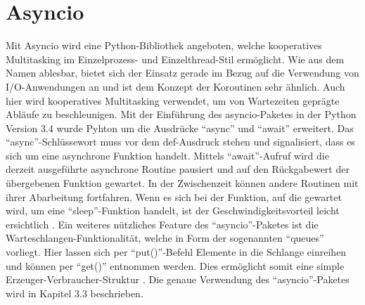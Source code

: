 \section{Asyncio}
Mit Asyncio wird eine Python-Bibliothek angeboten, welche kooperatives Multitasking im Einzelprozess- und Einzelthread-Stil ermöglicht. Wie aus dem Namen ablesbar, bietet sich der Einsatz gerade im Bezug auf die Verwendung von I/O-Anwendungen an und ist dem Konzept der Koroutinen sehr ähnlich. Auch hier wird kooperatives Multitasking verwendet, um von Wartezeiten geprägte Abläufe zu beschleunigen. Mit der Einführung des asyncio-Paketes in der Python Version 3.4 wurde Pyhton um die Ausdrücke ``async'' und ``await'' erweitert. Das ``async''-Schlüssewort muss vor dem def-Ausdruck stehen und signalisiert, dass es sich um eine asynchrone Funktion handelt. Mittels ``await''-Aufruf wird die derzeit ausgeführte asynchrone Routine pausiert und auf den Rückgabewert der übergebenen Funktion gewartet. In der Zwischenzeit können andere Routinen mit ihrer Abarbeitung fortfahren. Wenn es sich bei der Funktion, auf die gewartet wird, um eine ``sleep''-Funktion handelt, ist der Geschwindigkeitsvorteil leicht ersichtlich \cite{PythonSoftwareFoundation.b}. Ein weiteres nützliches Feature des ``asyncio''-Paketes ist die Warteschlangen-Funktionalität, welche in Form der sogenannten ``queues'' vorliegt. Hier lassen sich per ``put()''-Befehl Elemente in die Schlange einreihen und können per ``get()'' entnommen werden. Dies ermöglicht somit eine simple Erzeuger-Verbraucher-Struktur \cite{PythonSoftwareFoundation.e}. Die genaue Verwendung des ``asyncio''-Paketes wird in Kapitel 3.3 beschrieben. 

